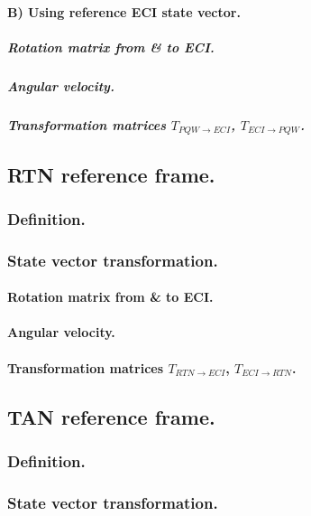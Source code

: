 		\paragraph{B) Using reference ECI state vector. \\}
			\subparagraph{Rotation matrix from \& to ECI. \\}
			\subparagraph{Angular velocity. \\}
			\subparagraph{Transformation matrices $T_{PQW\rightarrow ECI}$, $T_{ECI\rightarrow PQW}$. \\}
		
	\subsection{RTN reference frame.}
		\subsubsection{Definition.}
		\subsubsection{State vector transformation.}
			\paragraph{Rotation matrix from \& to ECI. \\}
			\paragraph{Angular velocity. \\}
			\paragraph{Transformation matrices $T_{RTN\rightarrow ECI}$, $T_{ECI\rightarrow RTN}$. \\}
		
		
	\subsection{TAN reference frame.}
		\subsubsection{Definition.}
		\subsubsection{State vector transformation.}
